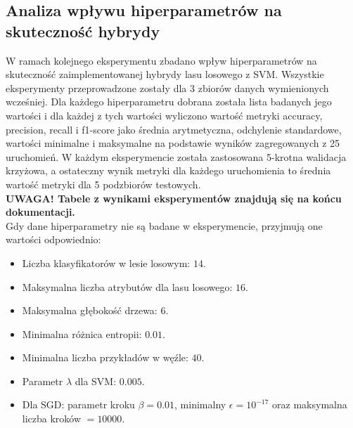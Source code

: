 \documentclass[
    left=2.5cm,         %
    right=2.5cm,        %
    top=2.5cm,          %
    bottom=3cm,         %
    bindingoffset=6mm,  %
    nohyphenation=false %
]{eiti/eiti-report}
\begin{document}
\subsection{Analiza wpływu hiperparametrów na skuteczność hybrydy}
W ramach kolejnego eksperymentu zbadano wpływ hiperparametrów na skuteczność zaimplementowanej hybrydy lasu losowego z SVM.
Wszystkie eksperymenty przeprowadzone zostały dla 3 zbiorów danych wymienionych wcześniej. Dla każdego hiperparametru dobrana została lista badanych jego wartości i dla każdej z tych wartości wyliczono wartość metryki accuracy, precision, recall i f1-score jako średnia arytmetyczna, odchylenie standardowe, wartości minimalne i maksymalne na podstawie wyników zagregowanych z 25 uruchomień. W każdym eksperymencie została zastosowana 5-krotna walidacja krzyżowa, a ostateczny wynik metryki dla każdego uruchomienia to średnia wartość metryki dla 5 podzbiorów testowych.
\\
\textbf{UWAGA! Tabele z wynikami eksperymentów znajdują się na końcu dokumentacji.}
\\
Gdy dane hiperparametry nie są badane w eksperymencie, przyjmują one wartości odpowiednio:
\begin{itemize}
    \item Liczba klasyfikatorów w lesie losowym: $14$.
    \item Maksymalna liczba atrybutów dla lasu losowego: $16$.
    \item Maksymalna głębokość drzewa: $6$.
    \item Minimalna różnica entropii: $0.01$.
    \item Minimalna liczba przykładów w węźle: $40$.
    \item Parametr $\lambda$ dla SVM: $0.005$.
    \item Dla SGD: parametr kroku $\beta=0.01$, minimalny $\epsilon=10^{-17}$ oraz maksymalna liczba kroków $=10000$.
\end{itemize}
\end{document}
